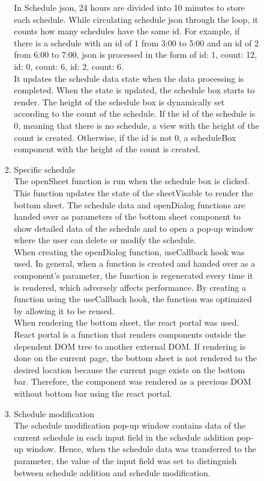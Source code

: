 \documentclass[conference]{IEEEtran}
\begin{document}
\begin{enumerate}[label=\arabic*.]
\begin{enumerate}[label=\arabic*.]
\begin{enumerate}[label=\alph*.]
\begin{enumerate}[label=\roman*.]
            In Schedule json, 24 hours are divided into 10 minutes to store each schedule. While circulating schedule json through the loop, it counts how many schedules have the same id. For example, if there is a schedule with an id of 1 from 3:00 to 5:00 and an id of 2 from 6:00 to 7:00, json is processed in the form of {id: 1, count: 12}, {id: 0, count: 6}, {id: 2, count: 6}. \\
            It updates the schedule data state when the data processing is completed. When the state is updated, the schedule box starts to render. The height of the schedule box is dynamically set according to the count of the schedule. If the id of the schedule is 0, meaning that there is no schedule, a view with the height of the count is created. Otherwise, if the id is not 0, a scheduleBox component with the height of the count is created. \\
            \item {\large{Specific schedule}}\\
            The openSheet function is run when the schedule box is clicked. This function updates the state of the sheetVisable to render the bottom sheet. The schedule data and openDialog functions are handed over as parameters of the bottom sheet component to show detailed data of the schedule and to open a pop-up window where the user can delete or modify the schedule. \\
            When creating the openDialog function, useCallback hook was used. In general, when a function is created and handed over as a component's parameter, the function is regenerated every time it is rendered, which adversely affects performance. By creating a function using the useCallback hook, the function was optimized by allowing it to be reused. \\ 
            When rendering the bottom sheet, the react portal was used. React portal is a function that renders components outside the dependent DOM tree to another external DOM. If rendering is done on the current page, the bottom sheet is not rendered to the desired location because the current page exists on the bottom bar. Therefore, the component was rendered as a previous DOM without bottom bar using the react portal. \\
            \item {\large{Schedule modification}}\\
            The schedule modification pop-up window contains data of the current schedule in each input field in the schedule addition pop-up window. Hence, when the schedule data was transferred to the parameter, the value of the input field was set to distinguish between schedule addition and schedule modification. \\

\end{enumerate}
\end{enumerate}
\end{enumerate}
\end{enumerate}
\end{document}

